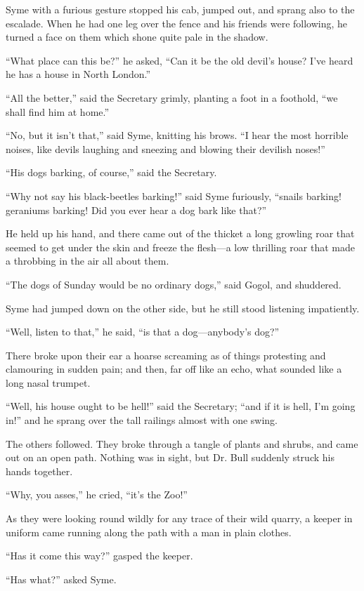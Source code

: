 \documentclass{book}
\begin{document}
Syme with a furious gesture stopped his cab, jumped out, and sprang also to the escalade. When he had one leg over the fence and his friends were following, he turned a face on them which shone quite pale in the shadow.

“What place can this be?” he asked, “Can it be the old devil’s house? I’ve heard he has a house in North London.”

“All the better,” said the Secretary grimly, planting a foot in a foothold, “we shall find him at home.”

“No, but it isn’t that,” said Syme, knitting his brows. “I hear the most horrible noises, like devils laughing and sneezing and blowing their devilish noses!”

“His dogs barking, of course,” said the Secretary.

“Why not say his black-beetles barking!” said Syme furiously, “snails barking! geraniums barking! Did you ever hear a dog bark like that?”

He held up his hand, and there came out of the thicket a long growling roar that seemed to get under the skin and freeze the flesh—a low thrilling roar that made a throbbing in the air all about them.

“The dogs of Sunday would be no ordinary dogs,” said Gogol, and shuddered.

Syme had jumped down on the other side, but he still stood listening impatiently.

“Well, listen to that,” he said, “is that a dog—anybody’s dog?”

There broke upon their ear a hoarse screaming as of things protesting and clamouring in sudden pain; and then, far off like an echo, what sounded like a long nasal trumpet.

“Well, his house ought to be hell!” said the Secretary; “and if it is hell, I’m going in!” and he sprang over the tall railings almost with one swing.

The others followed. They broke through a tangle of plants and shrubs, and came out on an open path. Nothing was in sight, but Dr. Bull suddenly struck his hands together.

“Why, you asses,” he cried, “it’s the Zoo!”

As they were looking round wildly for any trace of their wild quarry, a keeper in uniform came running along the path with a man in plain clothes.

“Has it come this way?” gasped the keeper.

“Has what?” asked Syme.
\end{document}
